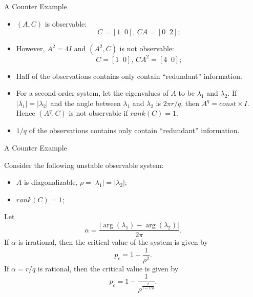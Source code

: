 \documentclass{beamer}
\begin{document}
  \begin{frame}{A Counter Example}
    \begin{itemize} 
      \item $(A,C)$ is observable:
	\begin{displaymath}
	 C = [1\;\;0],\,CA = [0\;\;2]; 
	\end{displaymath}
      \item However, $A^2 =4I$ and $(A^2,C)$ is not observable:
	\begin{displaymath}
	 C = [1\;\;0],\,CA^2 = [4\;\;0]; 
	\end{displaymath}
      \item Half of the observations contains only contain ``redundant'' information.
      \item For a second-order system, let the eigenvalues of $A$ to be $\lambda_1$ and $\lambda_2$. If $|\lambda_1| = |\lambda_2|$ and the angle between $\lambda_1$ and $\lambda_2$ is $2\pi r/q$, then $A^q = const\times I$. Hence $(A^q,C)$ is not observable if $rank(C) = 1$.
      \item $1/q$ of the observations contains only contain ``redundant'' information.
    \end{itemize}
  \end{frame}

  \begin{frame}{A Counter Example}
    \begin{theorem}
      Consider the following unstable observable system:
      \begin{itemize}
	\item  $A$ is diagonalizable, $\rho = |\lambda_1| = |\lambda_2| $;
	\item  $rank(C) = 1$;
      \end{itemize}
      Let
      \begin{displaymath}
	\alpha = \frac{|\arg(\lambda_1)-\arg(\lambda_2)|}{2\pi}.	
      \end{displaymath}
      If $\alpha$ is irrational, then the critical value of the system is given by
      \begin{displaymath}
	p_c = 1-\frac{1}{\rho^2}.
      \end{displaymath}
      If $\alpha = r/q$ is rational, then the critical value is given by
      \begin{displaymath}
	p_c = 1-\frac{1}{\rho^{\frac{2}{1-1/q}}}.
      \end{displaymath}
    \end{theorem}
  \end{frame}
\end{document}
